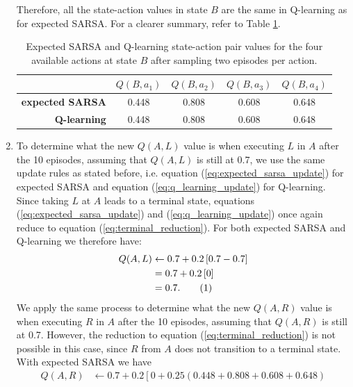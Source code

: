 \documentclass{article}
\newcommand\numberthis{\addtocounter{equation}{1}\tag{\theequation}}
\begin{document}
\begin{enumerate}
	      Therefore, all the state-action values in state $B$ are the same in Q-learning as for
	      expected SARSA. For a clearer summary, refer to Table \ref{tab:b_qvalues}.
	      \begin{table}[ht]
		      \centering
		      \caption{Expected SARSA and Q-learning state-action pair values for the four available
			      actions at state $B$ after sampling two episodes per action.}
		      \label{tab:b_qvalues}
		      \begin{tabular}{@{}rcccc@{}}
			      \toprule
			                              & $Q(B, a_1)$ & $Q(B, a_2)$ & $Q(B, a_3)$ & $Q(B, a_4)$ \\ \midrule
			      \textbf{expected SARSA} & 0.448       & 0.808       & 0.608       & 0.648       \\
			      \textbf{Q-learning}     & 0.448       & 0.808       & 0.608       & 0.648       \\ \bottomrule
		      \end{tabular}
	      \end{table}
	\item To determine what the new $Q(A, L)$ value is when executing $L$ in $A$ after the 10
	      episodes, assuming that $Q(A, L)$ is still at 0.7, we use the same update rules as stated
	      before, i.e. equation (\ref{eq:expected_sarsa_update}) for expected SARSA and equation
	      (\ref{eq:q_learning_update}) for Q-learning. Since taking $L$ at $A$ leads to a terminal
	      state, equations (\ref{eq:expected_sarsa_update}) and (\ref{eq:q_learning_update}) once
	      again reduce to equation (\ref{eq:terminal_reduction}). For both expected SARSA and
	      Q-learning we therefore have:
	      \begin{align*}
		      Q(A, L) & \leftarrow 0.7 + 0.2 \left[ 0.7 - 0.7 \right] \\
		              & = 0.7 + 0.2 \left[ 0 \right]                  \\
		              & = 0.7. \numberthis
	      \end{align*}
	      We apply the same process to determine what the new $Q(A, R)$ value is when executing $R$ in
	      $A$ after the 10 episodes, assuming that $Q(A, R)$ is still at 0.7. However, the reduction
	      to equation (\ref{eq:terminal_reduction}) is not possible in this case, since $R$ from $A$
	      does not transition to a terminal state. With expected SARSA we have
	      \begin{align*}
		      Q(A, R) & \leftarrow 0.7 + 0.2 \left[ 0 + 0.25\left(0.448 + 0.808 + 0.608 + 0.648\right)

\end{align*}
\end{enumerate}
\end{document}
